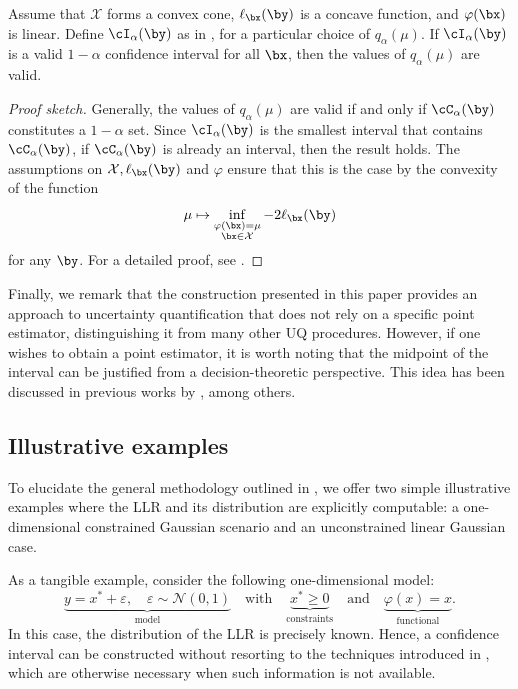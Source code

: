 \documentclass[11pt]{article}
\numberwithin{equation}{section}
\numberwithin{figure}{section}
\begin{document}
\begin{proposition}\label{thm:interval_coverage_converse}
Assume that $\mathcal X$ forms a convex cone, $\ell_\bx(\by)$ is a concave function, and $\varphi(\bx)$ is linear.
Define $\cI_\alpha(\by)$ as in , for a particular choice of $q_\alpha(\mu)$. 
If $\cI_\alpha(\by)$ is a valid $1-\alpha$ confidence interval for all $\bx$, then the values of $q_\alpha(\mu)$ are valid.
\end{proposition}
\begin{proof}[Proof sketch]
    Generally, the values of $q_\alpha(\mu)$ are valid if and only if $\cC_\alpha(\by)$ constitutes a $1-\alpha$ set.
    Since $\cI_\alpha(\by)$ is the smallest interval that contains $\cC_\alpha(\by)$, if $\cC_\alpha(\by)$ is already an interval, then the result holds. 
    The assumptions on $\mathcal X, \ell_\bx(\by)$ and $\varphi$ ensure that this is the case by the convexity of the function 
    \[
        \mu \mapsto \inf_{\substack{\varphi(\bx) = \mu \\ \bx \in \mathcal{X}}} -2\ell_\bx(\by)
    \]
    for any $\by$. 
    For a detailed proof, see .
\end{proof}

Finally, we remark that the construction presented in this paper provides an approach to uncertainty quantification that does not rely on a specific point estimator, distinguishing it from many other UQ procedures. 
However, if one wishes to obtain a point estimator, it is worth noting that the midpoint of the interval can be justified from a decision-theoretic perspective.
This idea has been discussed in previous works by \cite{micchelli1977survey,Bajgiran2022}, among others.

\subsection{Illustrative examples}\label{subsec:examples_theorem}

To elucidate the general methodology outlined in , we offer two simple illustrative examples where the LLR and its distribution are explicitly computable: a one-dimensional constrained Gaussian scenario and an unconstrained linear Gaussian case.

As a tangible example, consider the following one-dimensional model:
\begin{equation} \label{eq:1d_toy_model}
    \underbrace{y= x^* + \varepsilon, \quad \varepsilon \sim \mathcal{N}(0,1)}_{\text{model}} \quad \text{with} \quad \underbrace{x^* \geq 0}_{\text{constraints}} \quad \text{and} \quad \underbrace{\varphi(x) = x}_{\text{functional}}.
\end{equation}
In this case, the distribution of the LLR is precisely known.
Hence, a confidence interval can be constructed without resorting to the techniques introduced in , which are otherwise necessary when such information is not available.
\end{document}
